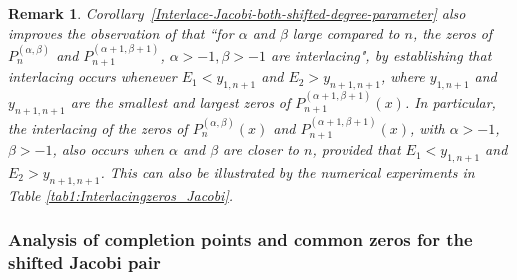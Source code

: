 \documentclass[final,3p,times,12pt]{elsarticle}
\newtheorem{remark}{Remark}[section]
\numberwithin{equation}{section}  %
\begin{document}
    
    \begin{remark}
		Corollary~\ref{Interlace-Jacobi-both-shifted-degree-parameter} also improves the observation of \cite[page 642]{Arvesu-Driver-Littlejohn-RamanujanJ-2023} that ``for $\alpha$ and $\beta$ large compared to $n$, the zeros of ${P}_n^{(\alpha,\beta)}$ and ${P}_{n+1}^{(\alpha+1,\beta+1)}$, $\alpha>-1,\beta>-1$ are interlacing", by establishing that interlacing occurs whenever $E_1 < y_{1,n+1}$ and $E_2 > y_{n+1,n+1}$, where $y_{1,n+1}$ and $y_{n+1,n+1}$ are the smallest and largest zeros of ${P}_{n+1}^{(\alpha+1,\beta+1)}(x)$. In particular, the interlacing of the zeros of ${P}_n^{(\alpha, \beta)}(x)$ and ${P}_{n+1}^{(\alpha+1, \beta+1)}(x)$, with $\alpha > -1$, $\beta > -1$, also occurs when $\alpha$ and $\beta$ are closer to $n$, provided that $E_1 < y_{1,n+1}$ and $E_2 > y_{n+1,n+1}$. This  can also be illustrated by the numerical experiments in Table \ref{tab1:Interlacingzeros_Jacobi}.
	\end{remark}

 \subsubsection{Analysis of completion points and common zeros for the shifted Jacobi pair}
\end{document}
